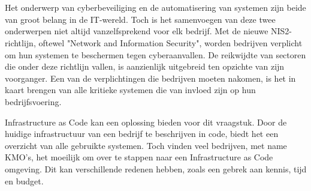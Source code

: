 
%
%
%
%

%


\chapter*{}

Het onderwerp van cyberbeveiliging en de automatisering van systemen zijn beide van groot belang in de IT-wereld.
Toch is het samenvoegen van deze twee onderwerpen niet altijd vanzelfsprekend voor elk bedrijf.
Met de nieuwe NIS2-richtlijn, oftewel "Network and Information Security", worden bedrijven verplicht om hun systemen te beschermen tegen cyberaanvallen.
De reikwijdte van sectoren die onder deze richtlijn vallen, is aanzienlijk uitgebreid ten opzichte van zijn voorganger.
Een van de verplichtingen die bedrijven moeten nakomen, is het in kaart brengen van alle kritieke systemen die van invloed zijn op hun bedrijfsvoering.

Infrastructure as Code kan een oplossing bieden voor dit vraagstuk.
Door de huidige infrastructuur van een bedrijf te beschrijven in code, biedt het een overzicht van alle gebruikte systemen.
Toch vinden veel bedrijven, met name KMO's, het moeilijk om over te stappen naar een Infrastructure as Code omgeving.
Dit kan verschillende redenen hebben, zoals een gebrek aan kennis, tijd en budget.

